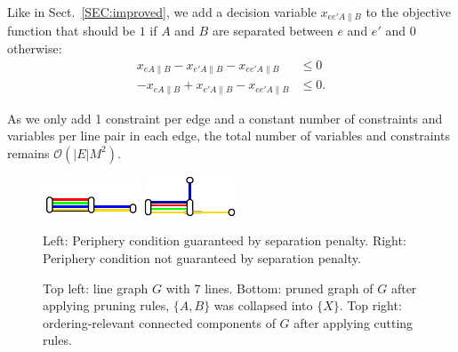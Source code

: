 \documentclass[format=acmsmall, review=false, screen=true]{acmart}
\begin{document}
Like in Sect.~\ref{SEC:improved}, we add a decision variable $x_{ee'A\|B}$ to the objective function that should be $1$ if $A$ and $B$ are separated between $e$ and $e'$ and $0$ otherwise:
\begin{align}
	x_{eA\|B} - x_{e'A\|B} - x_{ee'A\|B} &\leq 0 \\
	-x_{eA\|B} + x_{e'A\|B} - x_{ee'A\|B} &\leq 0.
\end{align}

As we only add 1 constraint per edge and a constant number of constraints and variables per line pair in each edge, the total number of variables and constraints remains $\mathcal{O}(|E|M^2)$.

\begin{figure}[b]
\centering
\begin{minipage}{.68\textwidth}
  \centering
  \includegraphics[trim={0 0.9 0 1.8},clip,width=.49\textwidth]{figures/render_examples/periphery/periphery_example1.pdf}
  \hfill
  \includegraphics[width=.48\textwidth]{figures/render_examples/periphery/periphery_example2.pdf}
  \caption{Left: Periphery condition guaranteed by separation penalty. Right: Periphery condition not guaranteed by separation penalty.}
  \label{FIG:periphery}
\end{minipage}
\end{figure}

\begin{figure}[t]
\centering
  
  \hfill
  
  \hfill
  
  \caption{Top left: line graph $G$ with 7 lines. Bottom: pruned graph of $G$ after applying pruning rules, $\{A, B\}$ was collapsed into $\{X\}$. Top right: ordering-relevant connected components of $G$ after applying cutting rules.}
  \label{FIG:coreoptimgraph}
\end{figure}
\end{document}
